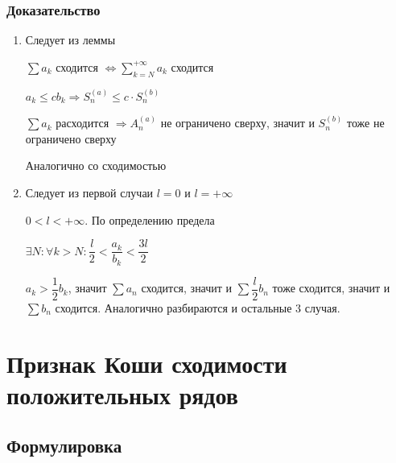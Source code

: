 \documentclass{article}
\begin{document}
            \subsubsection{Доказательство}
            
                \begin{enumerate}
                
                    \item Следует из леммы
                    
                        $\sum a_k$ сходится $\Leftrightarrow \sum\limits^{+\infty}_{k = N} a_k$ сходится
                        
                        $a_k \leq c b_k \Rightarrow S_n^{(a)} \leq c \cdot S^{(b)}_n$
                        
                        $\sum a_k$ расходится $\Rightarrow A^{(a)}_n$ не ограничено сверху, значит и $S^{(b)}_n$ тоже не ограничено сверху
                        
                        Аналогично со сходимостью
                        
                    \item Следует из первой случаи $l = 0$ и $l = +\infty$
                    
                        $0 < l < +\infty$. По определению предела
                        
                            $\exists N : \forall k > N : \dfrac{l}{2} < \dfrac{a_k}{b_k} < \dfrac{3l}{2}$
                            
                            $a_k > \dfrac{1}{2} b_k$, значит $\sum a_n$ сходится, значит и $\sum \dfrac{l}{2} b_n$ тоже сходится, значит и $\sum b_n$ сходится. Аналогично разбираются и остальные $3$ случая.
                    
                \end{enumerate}
                
    \newpage
    
    \section{Признак Коши сходимости положительных рядов}
    
        \subsection{Формулировка}
        
\end{document}
